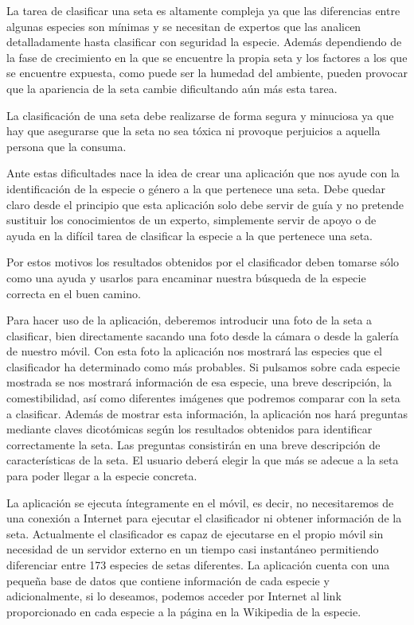 
La tarea de clasificar una seta es altamente compleja ya que las diferencias entre algunas especies son mínimas y se necesitan de expertos que las analicen detalladamente hasta clasificar con seguridad la especie. Además dependiendo de la fase de crecimiento en la que se encuentre la propia seta y los factores a los que se encuentre expuesta, como puede ser la humedad del ambiente, pueden provocar que la apariencia de la seta cambie dificultando aún más esta tarea. 

La clasificación de una seta debe realizarse de forma segura y minuciosa ya que hay que asegurarse que la seta no sea tóxica ni provoque perjuicios a aquella persona que la consuma.

Ante estas dificultades nace la idea de crear una aplicación que nos ayude con la identificación de la especie o género a la que pertenece una seta. Debe quedar claro desde el principio que esta aplicación solo debe servir de guía y no pretende sustituir los conocimientos de un experto, simplemente servir de apoyo o de ayuda en la difícil tarea de clasificar la especie a la que pertenece una seta. 

Por estos motivos los resultados obtenidos por el clasificador deben tomarse sólo como una ayuda y usarlos para encaminar nuestra búsqueda de la especie correcta en el buen camino.

Para hacer uso de la aplicación, deberemos introducir una foto de la seta a clasificar, bien directamente sacando una foto desde la cámara o desde la galería de nuestro móvil. Con esta foto la aplicación nos mostrará las especies que el clasificador ha determinado como más probables. Si pulsamos sobre cada especie mostrada se nos mostrará información de esa especie, una breve descripción, la comestibilidad, así como diferentes imágenes que podremos comparar con la seta a clasificar. Además de mostrar esta información, la aplicación nos hará preguntas mediante claves dicotómicas según los resultados obtenidos para identificar correctamente la seta. Las preguntas consistirán en una breve descripción de características de la seta. El usuario deberá elegir la que más se adecue a la seta para poder llegar a la especie concreta.

La aplicación se ejecuta íntegramente en el móvil, es decir, no necesitaremos de una conexión a Internet para ejecutar el clasificador ni obtener información de la seta. Actualmente el clasificador es capaz de ejecutarse en el propio móvil sin necesidad de un servidor externo en un tiempo casi instantáneo permitiendo diferenciar entre 173 especies de setas diferentes. La aplicación cuenta con una pequeña base de datos que contiene información de cada especie y adicionalmente, si lo deseamos, podemos acceder por Internet al link proporcionado en cada especie a la página en la Wikipedia de la especie.